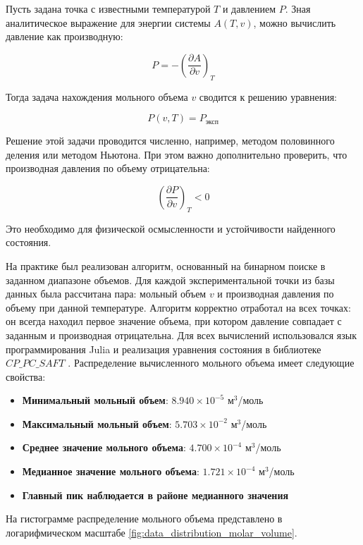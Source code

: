 \documentclass[a4paper,12pt]{article}
\begin{document}
      Пусть задана точка с известными температурой \( T \) и давлением \( P \). Зная аналитическое выражение для энергии системы \( A(T, v) \), можно вычислить давление как производную:
      
      \[
      P = -\left( \frac{\partial A}{\partial v} \right)_T
      \]
      
      Тогда задача нахождения мольного объема \( v \) сводится к решению уравнения:
      
      \[
      P(v, T) = P_{\text{эксп}}
      \]
      
      Решение этой задачи проводится численно, например, методом половинного деления или методом Ньютона. При этом важно дополнительно проверить, что производная давления по объему отрицательна:
      
      \[
      \left( \frac{\partial P}{\partial v} \right)_T < 0
      \]
      
      Это необходимо для физической осмысленности и устойчивости найденного состояния.
      
      На практике был реализован алгоритм, основанный на бинарном поиске в заданном диапазоне объемов. Для каждой экспериментальной точки из базы данных была рассчитана пара: мольный объем \( v \) и производная давления по объему при данной температуре. Алгоритм корректно отработал на всех точках: он всегда находил первое значение объема, при котором давление совпадает с заданным и производная отрицательна.
      Для всех вычислений использовался язык программирования Julia и реализация уравнения состояния в библиотеке $CP\_PC\_SAFT$ \cite{cppcsaft2024}.
      Распределение вычисленного мольного объема имеет следующие свойства:

      \begin{itemize}
          \item \textbf{Минимальный мольный объем}: \(8.940 \times 10^{-5}\) м\(^3\)/моль
          \item \textbf{Максимальный мольный объем}: \(5.703 \times 10^{-2}\) м\(^3\)/моль
          \item \textbf{Среднее значение мольного объема}: \(4.700 \times 10^{-4}\) м\(^3\)/моль
          \item \textbf{Медианное значение мольного объема}: \(1.721 \times 10^{-4}\) м\(^3\)/моль
          \item \textbf{Главный пик наблюдается в районе медианного значения} 
      \end{itemize}
      
      На гистограмме распределение мольного объема представлено в логарифмическом масштабе \autoref{fig:data_distribution_molar_volume}.
      
\end{document}
